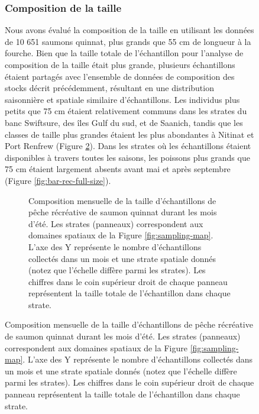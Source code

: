 \begin{figure}[H]
\subsubsection{Composition de la taille}

Nous avons évalué la composition de la taille en utilisant les données de 10 651 saumons quinnat, plus grands que 55 cm de longueur à la fourche. Bien que la taille totale de l'échantillon pour l'analyse de composition de la taille était plus grande, plusieurs échantillons étaient partagés avec l'ensemble de données de composition des stocks décrit précédemment, résultant en une distribution saisonnière et spatiale similaire d'échantillons. Les individus plus petits que 75 cm étaient relativement communs dans les strates du banc Swiftsure, des îles Gulf du sud, et de Saanich, tandis que les classes de taille plus grandes étaient les plus abondantes à Nitinat et Port Renfrew (Figure \ref{fig:bar-rec-summer-size}). Dans les strates où les échantillons étaient disponibles à travers toutes les saisons, les poissons plus grands que 75 cm étaient largement absents avant mai et après septembre (Figure \ref{fig:bar-rec-full-size}).

\begin{figure}[H]
    \centering
    \caption{Composition mensuelle de la taille d'échantillons de pêche récréative de saumon quinnat durant les mois d'été. Les strates (panneaux) correspondent aux domaines spatiaux de la Figure \ref{fig:sampling-map}. L'axe des Y représente le nombre d'échantillons collectés dans un mois et une strate spatiale donnés (notez que l'échelle diffère parmi les strates). Les chiffres dans le coin supérieur droit de chaque panneau représentent la taille totale de l'échantillon dans chaque strate.}
    \label{fig:bar-rec-summer-size}
\end{figure}


\end{figure}
